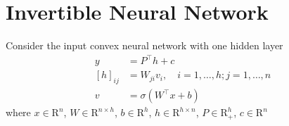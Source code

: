 \documentclass[11pt]{article}
\begin{document}
\section{Invertible Neural Network}
Consider the input convex neural network with one hidden layer 
\begin{align}
y &= P^{\top} h + c \\
[h]_{ij} &= W_{ji}v_i, \quad i = 1, \ldots, h; j = 1, \ldots, n \\
v &= \sigma(W^{\top}x + b)
\end{align}
where $x \in \mathrm{R}^n$, $W \in \mathrm{R}^{n \times h}$, $b \in \mathrm{R}^h$, $h \in \mathrm{R}^{h \times n}$, $P \in \mathrm{R}_{+}^h$, $c \in \mathrm{R}^n$
\end{document}
